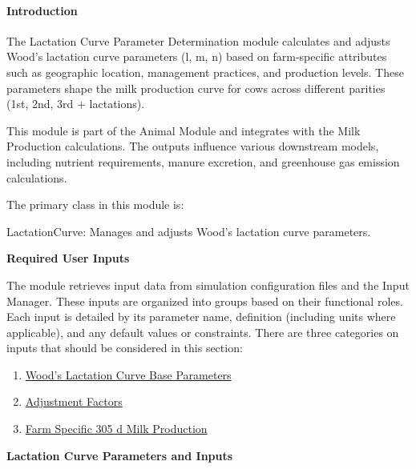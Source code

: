 \begin{refsection}
    \paragraph{Introduction} The Lactation Curve Parameter Determination module calculates and adjusts Wood’s lactation curve parameters (l, m, n) based on farm-specific attributes such as geographic location, management practices, and production levels. These parameters shape the milk production curve for cows across different parities (1st, 2nd, 3rd + lactations).
    
    This module is part of the Animal Module and integrates with the Milk Production calculations. The outputs influence various downstream models, including nutrient requirements, manure excretion, and greenhouse gas emission calculations.
    
    The primary class in this module is:
    
    LactationCurve: Manages and adjusts Wood’s lactation curve parameters.

\textbf{\hypertarget{lactcurvreqinputs}{Required User Inputs}}
\vspace{-0.25cm}

 The module retrieves input data from simulation configuration files and the Input Manager. These inputs are organized into groups based on their functional roles. Each input is detailed by its parameter name, definition (including units where applicable), and any default values or constraints. There are three categories on inputs that should be considered in this section: 
 \begin{enumerate}
     \item \hyperlink{woodscurve}{Wood's Lactation Curve Base Parameters}
     \item \hyperlink{lactcurvadjust}{Adjustment Factors}
     \item \hyperlink{farmspec305}{Farm Specific 305 d Milk Production}
 \end{enumerate}
 \vspace{0.1cm}

\newpage
\begin{landscape}

\textbf{ \hypertarget{woodscurve}{\large Lactation Curve Parameters and Inputs}} 

\pagestyle{landscapeplain}


\end{landscape}
\end{refsection}
